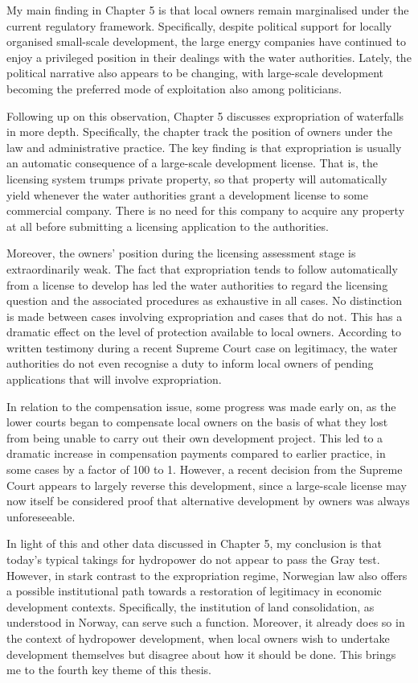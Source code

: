 My main finding in Chapter 5 is that local owners remain marginalised under the current regulatory framework. Specifically, despite political support for locally organised small-scale development, the large energy companies have continued to enjoy a privileged position in their dealings with the water authorities. Lately, the political narrative also appears to be changing, with large-scale development becoming the preferred mode of exploitation also among politicians.

Following up on this observation, Chapter 5 discusses expropriation of waterfalls in more depth. Specifically, the chapter track the position of owners under the law and administrative practice. The key finding is that expropriation is usually an automatic consequence of a large-scale development license. That is, the licensing system trumps private property, so that property will automatically yield whenever the water authorities grant a development license to some commercial company. There is no need for this company to acquire any property at all before submitting a licensing application to the authorities.

Moreover, the owners' position during the licensing assessment stage is extraordinarily weak. The fact that expropriation tends to follow automatically from a license to develop has led the water authorities to regard the licensing question and the associated procedures as exhaustive in all cases. No distinction is made between cases involving expropriation and cases that do not. This has a dramatic effect on the level of protection available to local owners. According to written testimony during a recent Supreme Court case on legitimacy, the water authorities do not even recognise a duty to inform local owners of pending applications that will involve expropriation. 

In relation to the compensation issue, some progress was made early on, as the lower courts began to compensate local owners on the basis of what they lost from being unable to carry out their own development project. This led to a dramatic increase in compensation payments compared to earlier practice, in some cases by a factor of 100 to 1. However, a recent decision from the Supreme Court appears to largely reverse this development, since a large-scale license may now itself be considered proof that alternative development by owners was always unforeseeable. 

In light of this and other data discussed in Chapter 5, my conclusion is that today's typical takings for hydropower do not appear to pass the Gray test. However, in stark contrast to the expropriation regime, Norwegian law also offers a possible institutional path towards a restoration of legitimacy in economic development contexts. Specifically, the institution of land consolidation, as understood in Norway, can serve such a function. Moreover, it already does so in the context of hydropower development, when local owners wish to undertake development themselves but disagree about how it should be done. This brings me to the fourth key theme of this thesis.

